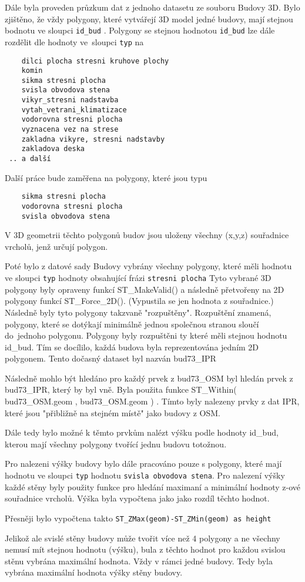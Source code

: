 Dále byla proveden průzkum dat z jednoho datasetu ze souboru Budovy 3D.
Bylo zjištěno, že vždy polygony, které vytvářejí 3D model jedné budovy,
mají stejnou bodnotu ve sloupci {\tt id\_bud} .
Polygony se stejnou hodnotou {\tt id\_bud} lze dále rozdělit dle hodnoty
ve~sloupci {\tt typ} na
 
\begin{verbatim}
    dilci plocha stresni kruhove plochy
    komin
    sikma stresni plocha
    svisla obvodova stena
    vikyr_stresni nadstavba
    vytah_vetrani_klimatizace
    vodorovna stresni plocha
    vyznacena vez na strese
    zakladna vikyre, stresni nadstavby
    zakladova deska
 .. a další
\end{verbatim}
Další práce bude zaměřena na polygony, které jsou typu
\begin{verbatim}
    sikma stresni plocha
    vodorovna stresni plocha
    svisla obvodova stena
\end{verbatim}
V 3D geometrii těchto polygonů budov jsou uloženy všechny (x,y,z) souřadnice
vrcholů, jenž určují polygon.

Poté bylo z datové sady Budovy vybrány všechny polygony, které
měli hodnotu ve sloupci {\tt typ} hodnoty obsahující frázi {\tt stresni plocha}
Tyto vybrané 3D polygony byly opraveny funkcí {ST_MakeValid()}
a následně přetvořeny na 2D polygony funkcí {ST_Force_2D()}.
(Vypustila se jen hodnota z souřadnice.)
Následně byly tyto polygony takzvaně "rozpuštěny". Rozpuštění znamená,
polygony, které se dotýkají minimálně jednou společnou stranou sloučí
do~jednoho polygonu.
Polygony byly rozpuštěni ty které měli stejnou hodnotu {id_bud}.
Tím se docílilo, každá budova byla reprezentována jedním 2D polygonem.
Tento dočasný dataset byl nazván {bud73_IPR}

Následně mohlo být hledáno pro každý prvek z {bud73_OSM} byl hledán
prvek z {bud73_IPR}, který by byl vně.
Byla použita funkce {ST_Within( bud73_OSM.geom , bud73_OSM.geom )} .
Tímto byly nalezeny prvky z dat IPR, které jsou "přibližně na stejném místě"
jako budovy z OSM.

Dále tedy bylo možné k těmto prvkům nalézt výšku podle hodnoty {id_bud},
kterou mají všechny polygony tvořící jednu budovu totožnou.

Pro nalezeni výšky budovy bylo dále pracováno pouze s polygony,
které mají hodnotu ve sloupci {\tt typ} hodnotu
{\tt svisla obvodova stena}.
Pro nalezení výšky každé stěny byly použity funkce pro hledání
maximaní a minimální hodnoty z-ové souřadnice vrcholů.
Výška byla vypočtena jako jako rozdíl těchto hodnot.

Přesněji bylo vypočtena takto {\tt ST\_ZMax(geom)-ST\_ZMin(geom) as height}

Jelikož ale svislé stěny budovy může tvořit více než 4 polygony a
ne všechny nemusí mít stejnou hodnotu (výšku), bula z těchto hodnot
pro každou svislou stěnu vybrána maximální hodnota. Vždy v rámci jedné budovy.
Tedy byla vybrána maximální hodnota výšky stěny budovy.

